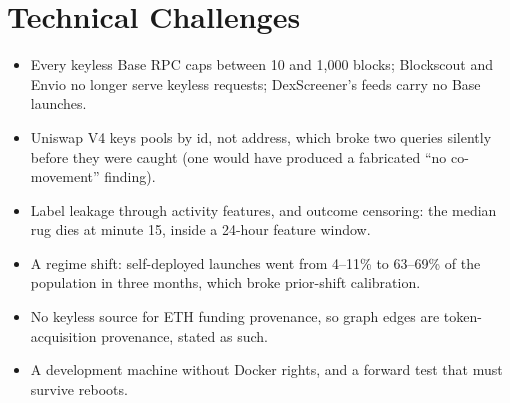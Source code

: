 \section{Technical Challenges}
\begin{itemize}
  \item Every keyless Base RPC caps  between 10 and 1,000 blocks; Blockscout and Envio no longer serve keyless requests; DexScreener's feeds carry no Base launches.
  \item Uniswap V4 keys pools by id, not address, which broke two queries silently before they were caught (one would have produced a fabricated ``no co-movement'' finding).
  \item Label leakage through activity features, and outcome censoring: the median rug dies at minute 15, inside a 24-hour feature window.
  \item A regime shift: self-deployed launches went from 4--11\% to 63--69\% of the population in three months, which broke prior-shift calibration.
  \item No keyless source for ETH funding provenance, so graph edges are token-acquisition provenance, stated as such.
  \item A development machine without Docker rights, and a forward test that must survive reboots.
\end{itemize}

